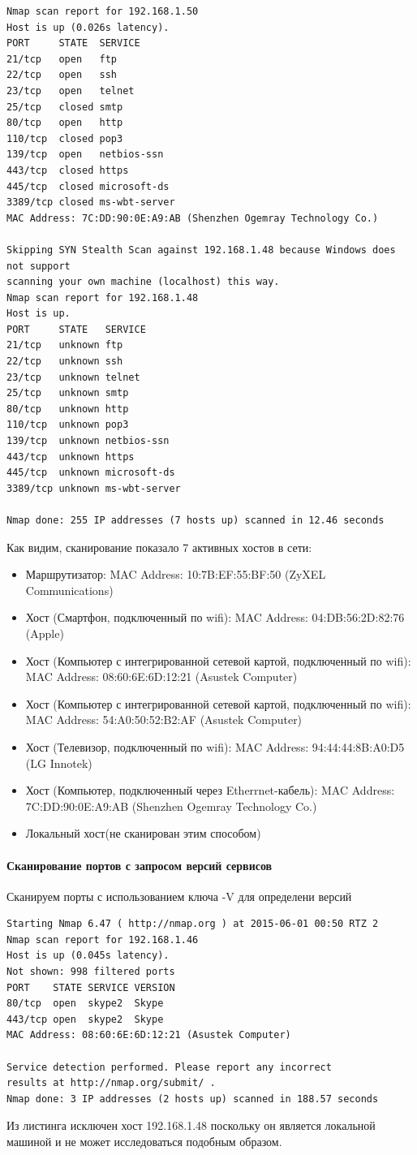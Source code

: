 \documentclass[a4paper, 14pt]{article}				%
\begin{document}
\begin{Verbatim}[frame=single]
Nmap scan report for 192.168.1.50
Host is up (0.026s latency).
PORT     STATE  SERVICE
21/tcp   open   ftp
22/tcp   open   ssh
23/tcp   open   telnet
25/tcp   closed smtp
80/tcp   open   http
110/tcp  closed pop3
139/tcp  open   netbios-ssn
443/tcp  closed https
445/tcp  closed microsoft-ds
3389/tcp closed ms-wbt-server
MAC Address: 7C:DD:90:0E:A9:AB (Shenzhen Ogemray Technology Co.)

Skipping SYN Stealth Scan against 192.168.1.48 because Windows does not support
scanning your own machine (localhost) this way.
Nmap scan report for 192.168.1.48
Host is up.
PORT     STATE   SERVICE
21/tcp   unknown ftp
22/tcp   unknown ssh
23/tcp   unknown telnet
25/tcp   unknown smtp
80/tcp   unknown http
110/tcp  unknown pop3
139/tcp  unknown netbios-ssn
443/tcp  unknown https
445/tcp  unknown microsoft-ds
3389/tcp unknown ms-wbt-server

Nmap done: 255 IP addresses (7 hosts up) scanned in 12.46 seconds
\end{Verbatim}
Как видим, сканирование показало 7 активных хостов в сети:
\begin{itemize}
\item{Маршрутизатор: MAC Address: 10:7B:EF:55:BF:50 (ZyXEL Communications)}
\item{Хост (Смартфон, подключенный по wifi): MAC Address: 04:DB:56:2D:82:76 (Apple)}
\item{Хост (Компьютер с интегрированной сетевой картой, подключенный по wifi): MAC Address: 08:60:6E:6D:12:21 (Asustek Computer)}
\item{Хост (Компьютер с интегрированной сетевой картой, подключенный по wifi): MAC Address: 54:A0:50:52:B2:AF (Asustek Computer)}
\item{Хост (Телевизор, подключенный по wifi): MAC Address: 94:44:44:8B:A0:D5 (LG Innotek)}
\item{Хост (Компьютер, подключенный через Etherrnet-кабель): MAC Address: 7C:DD:90:0E:A9:AB (Shenzhen Ogemray Technology Co.)}
\item{Локальный хост(не сканирован этим способом)}
\end{itemize}

\paragraph{Сканирование портов с запросом версий сервисов\\}
Сканируем порты с использованием ключа -V для определени версий
\begin{Verbatim}[frame=single]
Starting Nmap 6.47 ( http://nmap.org ) at 2015-06-01 00:50 RTZ 2
Nmap scan report for 192.168.1.46
Host is up (0.045s latency).
Not shown: 998 filtered ports
PORT    STATE SERVICE VERSION
80/tcp  open  skype2  Skype
443/tcp open  skype2  Skype
MAC Address: 08:60:6E:6D:12:21 (Asustek Computer)

Service detection performed. Please report any incorrect 
results at http://nmap.org/submit/ .
Nmap done: 3 IP addresses (2 hosts up) scanned in 188.57 seconds
\end{Verbatim}
Из листинга исключен хост 192.168.1.48 поскольку он является локальной машиной и не может исследоваться подобным образом.
\end{document}

